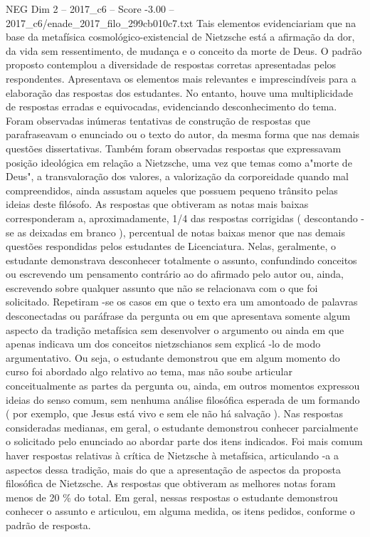 \begin{textsample}{NEG Dim 2 – 2017\_c6 – Score -3.00 – 2017\_c6/enade\_2017\_filo\_299cb010c7.txt}
Tais elementos evidenciariam que na base da metafísica cosmológico-existencial de Nietzsche está a afirmação da dor, da vida sem ressentimento, de mudança e o conceito da morte de Deus.
O padrão proposto contemplou a diversidade de respostas corretas apresentadas pelos respondentes.
Apresentava os elementos mais relevantes e imprescindíveis para a elaboração das respostas dos estudantes.
No entanto, houve uma multiplicidade de respostas erradas e equivocadas, evidenciando desconhecimento do tema.
Foram observadas inúmeras tentativas de construção de respostas que parafraseavam o enunciado ou o texto do autor, da mesma forma que nas demais questões dissertativas.
Também foram observadas respostas que expressavam posição ideológica em relação a Nietzsche, uma vez que temas como a"morte de Deus", a transvaloração dos valores, a valorização da corporeidade quando mal compreendidos, ainda assustam aqueles que possuem pequeno trânsito pelas ideias deste filósofo.
As respostas que obtiveram as notas mais baixas corresponderam a, aproximadamente, 1/4 das respostas corrigidas ( descontando -se as deixadas em branco ), percentual de notas baixas menor que nas demais questões respondidas pelos estudantes de Licenciatura.
Nelas, geralmente, o estudante demonstrava desconhecer totalmente o assunto, confundindo conceitos ou escrevendo um pensamento contrário ao do afirmado pelo autor ou, ainda, escrevendo sobre qualquer assunto que não se relacionava com o que foi solicitado.
Repetiram -se os casos em que o texto era um amontoado de palavras desconectadas ou paráfrase da pergunta ou em que apresentava somente algum aspecto da tradição metafísica sem desenvolver o argumento ou ainda em que apenas indicava um dos conceitos nietzschianos sem explicá -lo de modo argumentativo.
Ou seja, o estudante demonstrou que em algum momento do curso foi abordado algo relativo ao tema, mas não soube articular conceitualmente as partes da pergunta ou, ainda, em outros momentos expressou ideias do senso comum, sem nenhuma análise filosófica esperada de um formando ( por exemplo, que Jesus está vivo e sem ele não há salvação ).
Nas respostas consideradas medianas, em geral, o estudante demonstrou conhecer parcialmente o solicitado pelo enunciado ao abordar parte dos itens indicados.
Foi mais comum haver respostas relativas à crítica de Nietzsche à metafísica, articulando -a a aspectos dessa tradição, mais do que a apresentação de aspectos da proposta filosófica de Nietzsche.
As respostas que obtiveram as melhores notas foram menos de 20 \% do total.
Em geral, nessas respostas o estudante demonstrou conhecer o assunto e articulou, em alguma medida, os itens pedidos, conforme o padrão de resposta.

\end{textsample}
